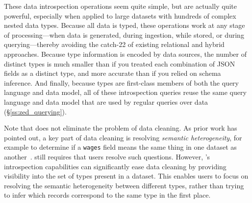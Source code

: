These data introspection operations seem quite simple, but are actually quite powerful, especially when applied to large datasets with hundreds of complex nested data types. Because all \sys{} data is typed, these operations work at any stage of processing---when data is generated, during ingestion, while stored, or during querying---thereby avoiding the catch-22 of existing relational and hybrid approaches. Because type information is encoded by data sources, the number of distinct types is much smaller than if you treated each combination of JSON fields as a distinct type, and more accurate than if you relied on schema inference. And finally, because types are first-class members of both the query language and data model, all of these introspection queries reuse the same query language and data model that are used by regular queries over data (\S\ref{ss:zed_querying}).

Note that \sys{} does not eliminate the problem of data cleaning. As prior work has pointed out, a key part of data cleaning is resolving {\em semantic heterogeneity}, for example to determine if a \texttt{wages} field means the same thing in one dataset as another~. \sys{} still requires that users resolve such questions. However, \sys{}'s introspection capabilities can significantly ease data cleaning by providing visibility into the set of types present in a dataset. This enables users to focus on resolving the semantic heterogeneity between different types, rather than trying to infer which records correspond to the same type in the first place.




\begin{comment}
Finally, \sys{} eases {\em shaping} by enabling users to shape values by type rather than field-by-field. \sys{} supports operators such as:
\begin{CompactItemize}
\item \texttt{crop(val, t)}: outputs \texttt{val} but omits any extra fields of \texttt{val} that are not in type \texttt{t}
\item \texttt{fill(val, t)}: outputs \texttt{val} but adds fields with a null value for all fields in type \texttt{t} that are not in \texttt{val}
\item \texttt{order(val, t)}: outputs \texttt{val} but with its fields re-ordered to match the order of fields in type \texttt{t}
\item \texttt{cast(val, t)}: outputs \texttt{val} but with the types of all its fields changed to match those of type \texttt{t}
\end{CompactItemize}

For example, suppose a user's temperature data is much more varied than what is shown in Figure~\ref{f:iot_data}, with many records containing 
\end{comment}

